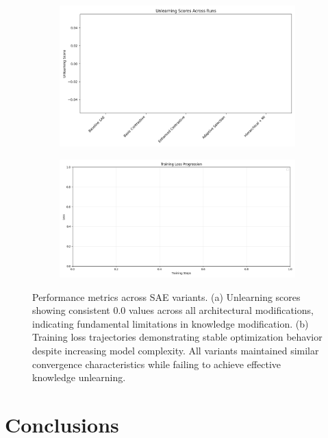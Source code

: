 \documentclass{article} %
\begin{document}
\begin{figure}[h]
    \centering
    \begin{subfigure}{0.49\textwidth}
        \includegraphics[width=\textwidth]{unlearning_scores.png}
        \label{fig:first-run}
    \end{subfigure}
    \hfill
    \begin{subfigure}{0.49\textwidth}
        \includegraphics[width=\textwidth]{training_losses.png}
        \label{fig:second-run}
    \end{subfigure}
    \caption{Performance metrics across SAE variants. (a) Unlearning scores showing consistent 0.0 values across all architectural modifications, indicating fundamental limitations in knowledge modification. (b) Training loss trajectories demonstrating stable optimization behavior despite increasing model complexity. All variants maintained similar convergence characteristics while failing to achieve effective knowledge unlearning.}
    \label{fig:first_figure}
\end{figure}

\section{Conclusions}
\label{sec:conclusion}
\end{document}
